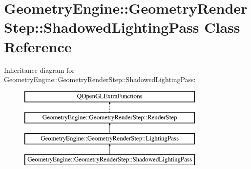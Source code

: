 \hypertarget{class_geometry_engine_1_1_geometry_render_step_1_1_shadowed_lighting_pass}{}\section{Geometry\+Engine\+::Geometry\+Render\+Step\+::Shadowed\+Lighting\+Pass Class Reference}
\label{class_geometry_engine_1_1_geometry_render_step_1_1_shadowed_lighting_pass}
Inheritance diagram for Geometry\+Engine\+::Geometry\+Render\+Step\+::Shadowed\+Lighting\+Pass\+:\begin{figure}[H]
\begin{center}
\leavevmode
\includegraphics[height=4.000000cm]{class_geometry_engine_1_1_geometry_render_step_1_1_shadowed_lighting_pass}
\end{center}
\end{figure}

